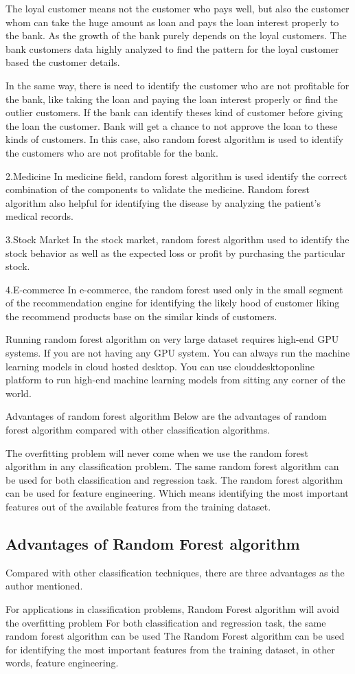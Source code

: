 \documentclass[a4paper,12pt]{article}
\begin{document}
The loyal customer means not the customer who pays well, but also the customer whom can take the huge amount as loan and pays the loan interest properly to the bank. As the growth of the bank purely depends on the loyal customers. The bank customers data highly analyzed to find the pattern for the loyal customer based the customer details.

In the same way, there is need to identify the customer who are not profitable for the bank, like taking the loan and paying the loan interest properly or find the outlier customers. If the bank can identify theses kind of customer before giving the loan the customer.  Bank will get a chance to not approve the loan to these kinds of customers. In this case, also random forest algorithm is used to identify the customers who are not profitable for the bank.

2.Medicine
In medicine field, random forest algorithm is used identify the correct combination of the components to validate the medicine. Random forest algorithm also helpful for identifying the disease by analyzing the patient’s medical records.

3.Stock Market
In the stock market, random forest algorithm used to identify the stock behavior as well as the expected loss or profit by purchasing the particular stock.

4.E-commerce
In e-commerce, the random forest used only in the small segment of the recommendation engine for identifying the likely hood of customer liking the recommend products base on the similar kinds of customers.

Running random forest algorithm on very large dataset requires high-end GPU systems. If you are not having any GPU system. You can always run the machine learning models in cloud hosted desktop. You can use clouddesktoponline platform to run high-end machine learning models from sitting any corner of the world.

Advantages of random forest algorithm
Below are the advantages of random forest algorithm compared with other classification algorithms.

The overfitting problem will never come when we use the random forest algorithm in any classification problem.
The same random forest algorithm can be used for both classification and regression task.
The random forest algorithm can be used for feature engineering.
Which means identifying the most important features out of the available features from the training dataset.

\subsection*{Advantages of Random Forest algorithm}
Compared with other classification techniques, there are three advantages as the author mentioned.

For applications in classification problems, Random Forest algorithm will avoid the overfitting problem
For both classification and regression task, the same random forest algorithm can be used
The Random Forest algorithm can be used for identifying the most important features from the training dataset, in other words, feature engineering.
\end{document}
